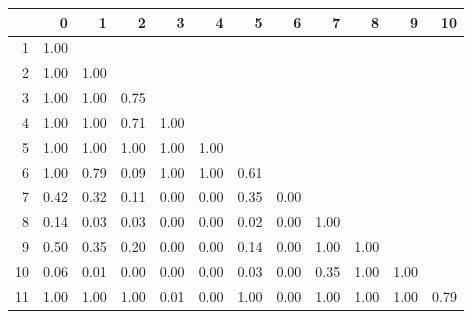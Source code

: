 % 
\begin{tabular}{rrrrrrrrrrrr}
  \hline
 & 0 & 1 & 2 & 3 & 4 & 5 & 6 & 7 & 8 & 9 & 10 \\ 
  \hline
1 & 1.00 &  &  &  &  &  &  &  &  &  &  \\ 
  2 & 1.00 & 1.00 &  &  &  &  &  &  &  &  &  \\ 
  3 & 1.00 & 1.00 & 0.75 &  &  &  &  &  &  &  &  \\ 
  4 & 1.00 & 1.00 & 0.71 & 1.00 &  &  &  &  &  &  &  \\ 
  5 & 1.00 & 1.00 & 1.00 & 1.00 & 1.00 &  &  &  &  &  &  \\ 
  6 & 1.00 & 0.79 & 0.09 & 1.00 & 1.00 & 0.61 &  &  &  &  &  \\ 
  7 & 0.42 & 0.32 & 0.11 & 0.00 & 0.00 & 0.35 & 0.00 &  &  &  &  \\ 
  8 & 0.14 & 0.03 & 0.03 & 0.00 & 0.00 & 0.02 & 0.00 & 1.00 &  &  &  \\ 
  9 & 0.50 & 0.35 & 0.20 & 0.00 & 0.00 & 0.14 & 0.00 & 1.00 & 1.00 &  &  \\ 
  10 & 0.06 & 0.01 & 0.00 & 0.00 & 0.00 & 0.03 & 0.00 & 0.35 & 1.00 & 1.00 &  \\ 
  11 & 1.00 & 1.00 & 1.00 & 0.01 & 0.00 & 1.00 & 0.00 & 1.00 & 1.00 & 1.00 & 0.79 \\ 
   \hline
\end{tabular}
% 
